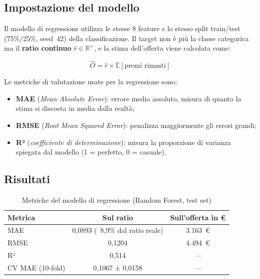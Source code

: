 \documentclass[12pt, a4paper]{article}
\begin{document}
\subsection{Impostazione del modello}

Il modello di regressione utilizza le stesse 8 feature e lo stesso
split train/test (75\%/25\%, seed~42) della classificazione.
Il target non è più la classe categorica ma il \textbf{ratio continuo}
$\hat{r} \in \mathbb{R}^+$, e la stima dell'offerta viene calcolata come:

\begin{equation}
  \hat{O} = \hat{r} \times \mathbb{E}[\text{premi rimasti}]
\end{equation}

Le metriche di valutazione usate per la regressione sono:

\begin{itemize}
  \item \textbf{MAE} (\textit{Mean Absolute Error}): errore medio assoluto,
        misura di quanto la stima si discosta in media dalla realtà;
  \item \textbf{RMSE} (\textit{Root Mean Squared Error}): penalizza
        maggiormente gli errori grandi;
  \item \textbf{R²} (\textit{coefficiente di determinazione}): misura la
        proporzione di varianza spiegata dal modello (1 = perfetto, 0 = casuale).
\end{itemize}

\subsection{Risultati}

\begin{table}[H]
\centering
\caption{Metriche del modello di regressione (Random Forest, test set)}
\begin{tabular}{lcc}
  \toprule
  \textbf{Metrica} & \textbf{Sul ratio} & \textbf{Sull'offerta in €} \\
  \midrule
  MAE  & 0,0893 (~8,9\% dal ratio reale) & 3.163~€ \\
  RMSE & 0,1204 & 4.494~€ \\
  R²   & 0,514  & --- \\
  CV MAE (10-fold) & 0,1067 ± 0,0158 & --- \\
  \bottomrule
\end{tabular}
\label{tab:regressione}
\end{table}
\end{document}
